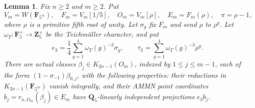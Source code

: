 \documentclass[11pt,a4paper]{amsart}
\numberwithin{equation}{section}
\newtheorem{lemma}[theorem]{Lemma}
\theoremstyle{definition}
\theoremstyle{remark}
\begin{document}
\begin{lemma}
\label{d2ext:dimtwoVisibleHigherCoefficientRank}
Fix $n\geq2$ and $m\geq2$. Put
\[
 V_m=W(\mathbf F_{5^m}),\quad F_m=V_m[1/5],\quad
 O_m=V_m[\rho],\quad E_m=F_m(\rho),\quad \pi=\rho-1,
\]
where $\rho$ is a primitive fifth root of unity.
Let $\sigma_g$ fix $F_m$ and send $\rho$ to $\rho^g$.
Let $\omega_T:\mathbf F_5^\times\to\mathbf Z_5^\times$ be the
Teichm\"uller character, and put
\[
 e_3=\frac14\sum_{g=1}^4\omega_T(g)^{-3}\sigma_g,\qquad
 \tau_3=\sum_{g=1}^4\omega_T(g)^{-3}\rho^g.
\]
There are actual classes
$\beta_j\in K_{2n-1}(O_m)$, indexed by $1\leq j\leq m-1$, each of the form
$(1-\sigma_{-1})\beta_{0,j}$, with the following properties:
their reductions in $K_{2n-1}(\mathbf F_{5^m})$ vanish integrally,
and their AMMN point coordinates $b_j=r_{n,O_m}(\beta_j)\in E_m$
have $\mathbf Q_5$-linearly independent projections $e_3b_j$.
\end{lemma}
\end{document}
